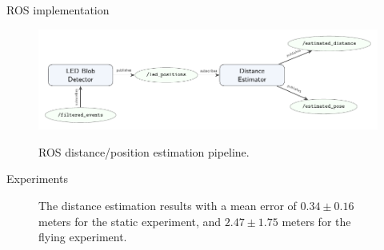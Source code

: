 \documentclass{beamer}
\begin{document}
\begin{frame}{ROS implementation}

    \begin{figure}
        \centering
        \includegraphics[width=1.0\textwidth]{../fig/tikz/rosflow.pdf}
        \label{fig:ros}
        \caption{ROS distance/position estimation pipeline.}
    \end{figure}

\end{frame}

\begin{frame}{Experiments}

\begin{figure}[H]
	\centering
	\caption{
            The distance estimation results with a mean error of
            $0.34 \pm 0.16$ meters for the static experiment, and
            $2.47 \pm 1.75$ meters for the flying experiment.
        }
	\label{fig:uav33_37}
\end{figure}

\end{frame}
\end{document}
